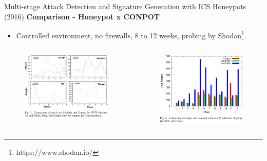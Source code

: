 \documentclass[compress]{beamer}
\begin{document}
\begin{frame}{Multi-stage Attack Detection and Signature Generation with ICS Honeypots (2016)}
    \textbf{Comparison - Honeypot x CONPOT}
    \begin{itemize}
     \item Controlled environment, no firewalls, 8 to 12 weeks, probing by Shodan\footnote{https://www.shodan.io/}.
    \end{itemize}
    \begin{columns}
     \begin{column}{0.55\textwidth}
      \begin{figure}
      \centering
      \includegraphics[width=1.0\textwidth]{./images/hostage-conpot-comparison.png}
      \label{fig:hostage-conpot-comparison}
      \end{figure}
     \end{column}
     \begin{column}{0.45\textwidth}
      \begin{figure}
      \centering
      \includegraphics[width=1.0\textwidth]{./images/hostage-ip-sources.png}

\end{figure}
\end{column}
\end{columns}
\end{frame}
\end{document}
